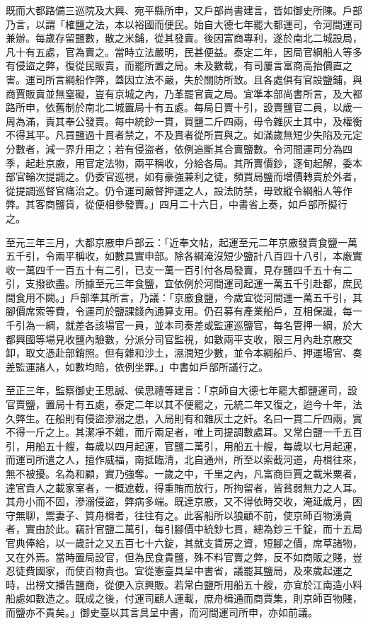 \begin{pinyinscope}
 既而大都路備三巡院及大興、宛平縣所申，又戶部尚書建言，皆如御史所陳。戶部乃言，以謂「榷鹽之法，本以裕國而便民。始自大德七年罷大都運司，令河間運司兼辦。每歲存留鹽數，散之米鋪，從其發賣。後因富商專利，遂於南北二城設局，凡十有五處，官為賣之。當時立法嚴明，民甚便益。泰定二年，因局官綱船人等多有侵盜之弊，復從民販賣，而罷所置之局。未及數載，有司屢言富商高抬價直之害。運司所言綱船作弊，蓋因立法不嚴，失於關防所致。且各處俱有官設鹽鋪，與商賈販賣並無窒礙，豈有京城之內，乃革罷官賣之局。宜準本部尚書所言，及大都路所申，依舊制於南北二城置局十有五處。每局日賣十引，設賣鹽官二員，以歲一周為滿，責其奉公發賣。每中統鈔一貫，買鹽二斤四兩，毋令雜灰土其中，及權衡不得其平。凡買鹽過十貫者禁之，不及貫者從所買與之。如滿歲無短少失陷及元定分數者，減一界升用之；若有侵盜者，依例追斷其合賣鹽數。令河間運司分為四季，起赴京廒，用官定法物，兩平稱收，分給各局。其所賣價鈔，逐旬起解，委本部官輪次提調之。仍委官巡視，如有豪強兼利之徒，頻買局鹽而增價轉賣於外者，從提調巡督官痛治之。仍令運司嚴督押運之人，設法防禁，毋致縱令綱船人等作弊。其客商鹽貨，從便相參發賣。」四月二十六日，中書省上奏，如戶部所擬行之。



 至元三年三月，大都京廒申戶部云：「近奉文帖，起運至元二年京廒發賣食鹽一萬五千引，令兩平稱收，如數具實申部。除各綱淹沒短少鹽計八百四十八引，本廒實收一萬四千一百五十有二引，已支一萬一百引付各局發賣，見存鹽四千五十有二引，支撥欲盡。所據至元三年食鹽，宜依例於河間運司起運一萬五千引赴都，庶民間食用不闕。」戶部準其所言，乃議：「京廒食鹽，今歲宜從河間運一萬五千引，其腳價席索等費，令運司於鹽課錢內通算支用。仍召募有產業船戶，互相保識，每一千引為一綱，就差各該場官一員，並本司奏差或監運巡鹽官，每名管押一綱，於大都興國等場見收鹽內驗數，分派分司官監視，如數兩平支收，限三月內赴京廒交卸，取文憑赴部銷照。但有雜和沙土，濕潤短少數，並令本綱船戶、押運場官、奏差監運諸人，如數均賠，依例坐罪。」中書如戶部所議行之。



 至正三年，監察御史王思誠、侯思禮等建言：「京師自大德七年罷大都鹽運司，設官賣鹽，置局十有五處，泰定二年以其不便罷之，元統二年又復之，迨今十年，法久弊生。在船則有侵盜滲溺之患，入局則有和雜灰土之奸。名曰一貫二斤四兩，實不得一斤之上。其潔凈不雜，而斤兩足者，唯上司提調數處耳。又常白鹽一千五百引，用船五十艘，每歲以四月起運，官鹽二萬引，用船五十艘，每歲以七月起運，而運司所遣之人，擅作威福，南抵臨清，北自通州，所至以索截河道，舟楫往來，無不被擾。名為和顧，實乃強奪。一歲之中，千里之內，凡富商巨賈之載米粟者，達官貴人之載家室者，一概遮截，得重賄而放行，所拘留者，皆貧弱無力之人耳。其舟小而不固，滲溺侵盜，弊病多端。既達京廒，又不得依時交收，淹延歲月，困守無聊，鬻妻子、質舟楫者，往往有之。此客船所以狼顧不前，使京師百物湧貴者，實由於此。竊計官鹽二萬引，每引腳價中統鈔七貫，總為鈔三千錠，而十五局官典俸給，以一歲計之又五百七十六錠，其就支賃房之資，短腳之價，席草諸物，又在外焉。當時置局設官，但為民食貴鹽，殊不料官賣之弊，反不如商販之賤，豈忍徒費國家，而使百物貴也。宜從憲臺具呈中書省，議罷其鹽局，及來歲起運之時，出榜文播告鹽商，從便入京興販。若常白鹽所用船五十艘，亦宜於江南造小料船處如數造之。既成之後，付運司顧人運載，庶舟楫通而商賈集，則京師百物賤，而鹽亦不貴矣。」御史臺以其言具呈中書，而河間運司所申，亦如前議。




\end{pinyinscope}
